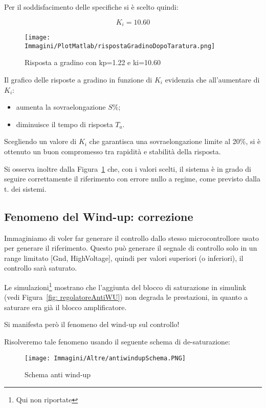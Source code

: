 \documentclass[a4paper,12pt]{article}
\begin{document}
Per il soddisfacimento delle specifiche si è scelto quindi:

\[
    K_i = 10.60
\]

\begin{figure}[h!]
    \centering
    \texttt{[image: Immagini/PlotMatlab/rispostaGradinoDopoTaratura.png]}
    \caption{Risposta a gradino con kp=1.22 e ki=10.60}
    \label{fig:kiscelto}
\end{figure}

\vspace{0.5cm}

Il grafico delle risposte a gradino in funzione di $K_i$ evidenzia che all’aumentare di $K_i$:
\begin{itemize}
    \item aumenta la sovraelongazione $S\%$;
    \item diminuisce il tempo di risposta $T_a$.
\end{itemize}

Scegliendo un valore di $K_i$ che garantisca una sovraelongazione limite al 20\%, si è ottenuto un buon compromesso tra rapidità e stabilità della risposta.


\vspace{0.5cm}
Si osserva inoltre dalla Figura~\ref{fig:kiscelto} che, con i valori scelti, il sistema è in grado di seguire correttamente il riferimento con errore nullo a regime, come previsto dalla t. dei sistemi.


\subsection{Fenomeno del Wind-up: correzione}

Immaginiamo di voler far generare il controllo dallo stesso microcontrollore usato per generare il riferimento.
Questo può generare il segnale di controllo solo in un range limitato [Gnd, HighVoltage], quindi per valori superiori (o inferiori), il controllo sarà saturato.

Le simulazioni\footnote{Qui non riportate} mostrano che l'aggiunta del blocco di saturazione in simulink (vedi Figura~\ref{fig: regolatoreAntiWU})  non degrada le prestazioni, in quanto a saturare era già il blocco amplificatore.

Si manifesta però il fenomeno del wind-up sul controllo!

\vspace{0.5cm}

Risolveremo tale fenomeno usando il seguente schema di de-saturazione:
\begin{figure}[h!]
    \centering
    \texttt{[image: Immagini/Altre/antiwindupSchema.PNG]}
    \caption{Schema anti wind-up}
    \label{fig:antiWindup}
\end{figure}
\end{document}
